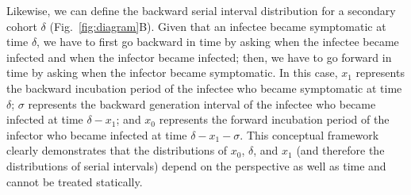 \documentclass[12pt]{article}
\newcommand{\fref}[1]{Fig.~\ref{fig:#1}}
\begin{document}
Likewise, we can define the backward serial interval distribution for a secondary cohort $\delta$ (\fref{diagram}B).
Given that an infectee became symptomatic at time $\delta$, we have to first go backward in time by asking when the infectee became infected and when the infector became infected; 
then, we have to go forward in time by asking when the infector became symptomatic.
In this case, $x_1$ represents the backward incubation period of the infectee who became symptomatic at time $\delta$;
$\sigma$ represents the backward generation interval of the infectee who became infected at time $\delta-x_1$;
and $x_0$ represents the forward incubation period of the infector who became infected at time $\delta-x_1-\sigma$.
This conceptual framework clearly demonstrates that the distributions of $x_0$, $\delta$, and $x_1$ (and therefore the distributions of serial intervals) depend on the perspective as well as time and cannot be treated statically.
\end{document}
